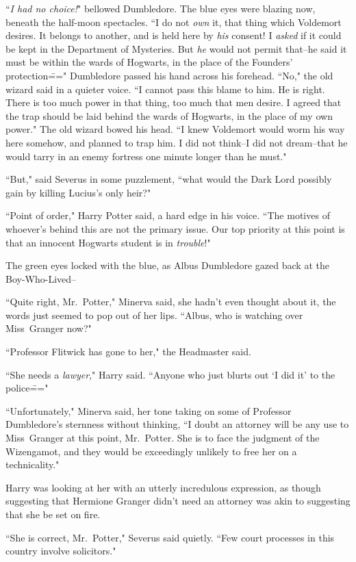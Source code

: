 ``\emph{I had no choice!}" bellowed Dumbledore. The blue eyes were blazing now, beneath the half-moon spectacles. ``I do not \emph{own} it, that thing which Voldemort desires. It belongs to another, and is held here by \emph{his} consent! I \emph{asked} if it could be kept in the Department of Mysteries. But \emph{he} would not permit that\---he said it must be within the wards of Hogwarts, in the place of the Founders' protection\===" Dumbledore passed his hand across his forehead. ``No," the old wizard said in a quieter voice. ``I cannot pass this blame to him. He is right. There is too much power in that thing, too much that men desire. I agreed that the trap should be laid behind the wards of Hogwarts, in the place of my own power." The old wizard bowed his head. ``I knew Voldemort would worm his way here somehow, and planned to trap him. I did not think\---I did not dream\---that he would tarry in an enemy fortress one minute longer than he must."

``But," said Severus in some puzzlement, ``what would the Dark Lord possibly gain by killing Lucius's only heir?"

``Point of order," Harry Potter said, a hard edge in his voice. ``The motives of whoever's behind this are not the primary issue. Our top priority at this point is that an innocent Hogwarts student is in \emph{trouble}!"

The green eyes locked with the blue, as Albus Dumbledore gazed back at the Boy-Who-Lived\---

``Quite right, Mr.~Potter," Minerva said, she hadn't even thought about it, the words just seemed to pop out of her lips. ``Albus, who is watching over Miss~Granger now?"

``Professor Flitwick has gone to her," the Headmaster said.

``She needs a \emph{lawyer}," Harry said. ``Anyone who just blurts out `I did it' to the police\==="

``Unfortunately," Minerva said, her tone taking on some of Professor Dumbledore's sternness without thinking, ``I doubt an attorney will be any use to Miss~Granger at this point, Mr.~Potter. She is to face the judgment of the Wizengamot, and they would be exceedingly unlikely to free her on a technicality."

Harry was looking at her with an utterly incredulous expression, as though suggesting that Hermione Granger didn't need an attorney was akin to suggesting that she be set on fire.

``She is correct, Mr.~Potter," Severus said quietly. ``Few court processes in this country involve solicitors."

